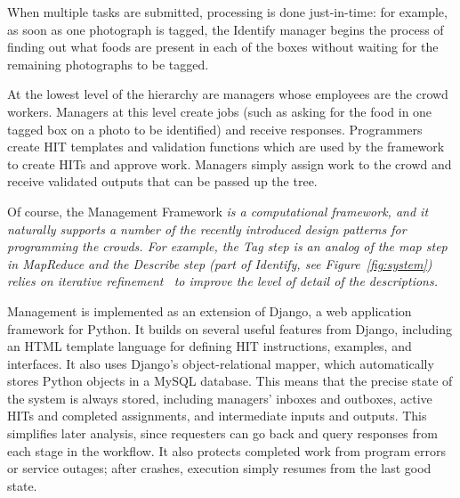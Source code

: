 When multiple tasks are submitted, processing is done just-in-time: for example, as soon as one photograph is tagged, the Identify manager begins the process of finding out what foods are present in each of the boxes without waiting for the remaining photographs to be tagged.  


At the lowest level of the hierarchy are managers whose employees are
the crowd workers. Managers at this level create jobs (such as asking
for the food in one tagged box on a photo to be identified) and
receive responses. Programmers create HIT templates and validation
functions which are used by the framework to create HITs and approve
work. Managers simply assign work to the crowd and receive validated outputs that can be passed up the
tree.

Of course, the Management Framework \em is \em a computational framework, and it naturally supports a number of the recently introduced design patterns for programming the crowds.  For example, the Tag step is an analog of the map step in MapReduce and the Describe step (part of Identify, see Figure~\ref{fig:system}) relies on iterative refinement~\cite{little10:exploring} to improve the level of detail of the descriptions.

Management is implemented as an extension of Django, a web application
framework for Python. It builds on several useful features from
Django, including an HTML template language for defining HIT
instructions, examples, and interfaces. It also uses Django's
object-relational mapper, which automatically stores Python objects in
a MySQL database. This means that the precise state of the system is
always stored, including managers' inboxes and outboxes, active HITs
and completed assignments, and intermediate inputs and outputs. This
simplifies later analysis, since requesters can go back and query
responses from each stage in the workflow. It also protects completed
work from program errors or service outages; after crashes, execution simply  
resumes from the last good state. 



